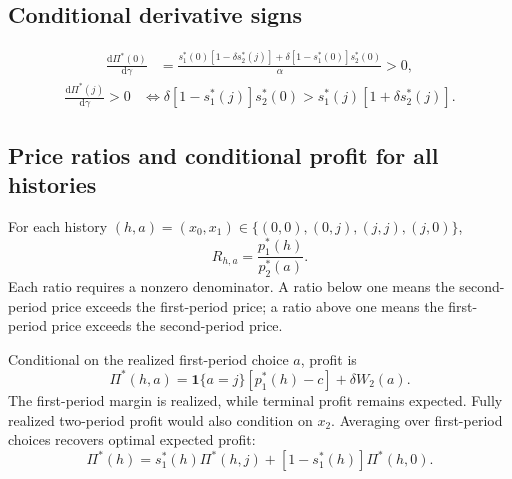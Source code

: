 \documentclass[11pt]{article}
\newcommand{\dd}{\mathrm{d}}
\newcommand{\ind}{\mathbf{1}}
\begin{document}
\subsection{Conditional derivative signs}
\begin{equation}
\begin{aligned}
\frac{\dd\Pi^*(0)}{\dd\gamma}
&=\frac{s_1^*(0)[1-\delta s_2^*(j)]+\delta[1-s_1^*(0)]s_2^*(0)}{\alpha}>0,
\end{aligned}
\end{equation}
\begin{equation}
\begin{aligned}
\frac{\dd\Pi^*(j)}{\dd\gamma}>0
&\iff\delta[1-s_1^*(j)]s_2^*(0)>s_1^*(j)[1+\delta s_2^*(j)].
\end{aligned}
\end{equation}

\subsection{Price ratios and conditional profit for all histories}
For each history $(h,a)=(x_0,x_1)\in\{(0,0),(0,j),(j,j),(j,0)\}$,
\begin{equation}
R_{h,a}=\frac{p_1^*(h)}{p_2^*(a)}.
\end{equation}
Each ratio requires a nonzero denominator. A ratio below one means the
second-period price exceeds the first-period price; a ratio above one means
the first-period price exceeds the second-period price.

Conditional on the realized first-period choice $a$, profit is
\begin{equation}
\Pi^*(h,a)=\ind\{a=j\}[p_1^*(h)-c]+\delta W_2(a).
\end{equation}
The first-period margin is realized, while terminal profit remains expected.
Fully realized two-period profit would also condition on $x_2$. Averaging over
first-period choices recovers optimal expected profit:
\begin{equation}
\Pi^*(h)=s_1^*(h)\Pi^*(h,j)+[1-s_1^*(h)]\Pi^*(h,0).
\end{equation}
\end{document}
